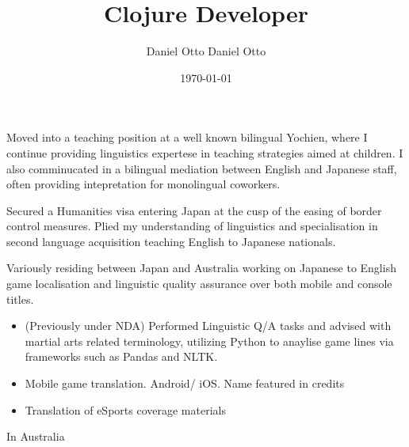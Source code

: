 \documentclass[10pt,a4paper,ragged2e,withhyper]{altacv}
\author{Daniel Otto Daniel Otto}
\date{\today}
\title{Clojure Developer}
\begin{document}

\makecvheader

\begin{paracol}{2}

\label{sec:org7fa02e3}
Moved into a teaching position at a well known bilingual Yochien, where I continue providing linguistics expertese in teaching strategies aimed at children. I also comminucated in a bilingual mediation between English and Japanese staff, often providing intepretation for monolingual coworkers.
\par\divider
{}
Secured a Humanities visa entering Japan at the cusp of the easing of border control measures. Plied my understanding of linguistics and specialisation in second language acquisition teaching English to Japanese nationals.
\par\divider
{}
Variously residing between Japan and Australia working on Japanese to English game localisation and linguistic quality assurance over both mobile and console titles.

\label{sec:org2769a7d}
\begin{itemize}
\item (Previously under NDA) Performed Linguistic Q/A tasks and advised with martial arts related terminology, utilizing Python to anaylise game lines via frameworks such as Pandas and NLTK.
\end{itemize}
\begin{itemize}
\item Mobile game translation. Android/ iOS. Name featured in credits
\end{itemize}
\begin{itemize}
\item Translation of eSports coverage materials
\end{itemize}
\label{sec:org29ad032}
In Australia
\switchcolumn


\end{paracol}
\end{document}
